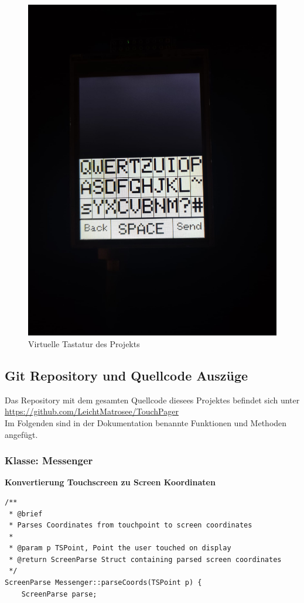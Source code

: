 \documentclass[a4paper, 11pt]{scrartcl}
\begin{document}
\begin{small}
\begin{figure}[H]
    \begin{center}
        \includegraphics[scale=0.13]{Bilder/Keys_standard.jpeg}
        \caption{Virtuelle Tastatur des Projekts}\label{pic:keys_standard}
    \end{center}
\end{figure}

\newpage
\subsection{Git Repository und Quellcode Auszüge}\label{ch:codeschnipsel}
Das Repository mit dem gesamten Quellcode diesees Projektes befindet sich unter
\\
\url{https://github.com/LeichtMatrosee/TouchPager}
\\
Im Folgenden sind in der Dokumentation benannte Funktionen und Methoden angefügt.

\subsubsection{Klasse: Messenger}
\textbf{Konvertierung Touchscreen zu Screen Koordinaten}\label{code:screenparse}
\begin{lstlisting}
/**
 * @brief 
 * Parses Coordinates from touchpoint to screen coordinates
 * 
 * @param p TSPoint, Point the user touched on display
 * @return ScreenParse Struct containing parsed screen coordinates
 */
ScreenParse Messenger::parseCoords(TSPoint p) {
    ScreenParse parse;
    

\end{lstlisting}
\end{small}
\end{document}
